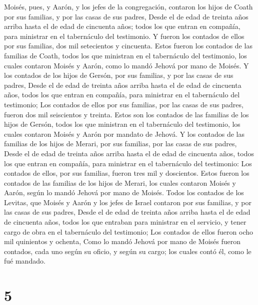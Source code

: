  Moisés, pues, y Aarón, y los jefes de la congregación,
contaron los hijos de Coath por sus familias, y por las casas de sus
padres,  Desde el de edad de treinta años arriba hasta el
de edad de cincuenta años; todos los que entran en compañía, para
ministrar en el tabernáculo del testimonio.  Y fueron los
contados de ellos por sus familias, dos mil setecientos y cincuenta.
 Estos fueron los contados de las familias de Coath,
todos los que ministran en el tabernáculo del testimonio, los cuales
contaron Moisés y Aarón, como lo mandó Jehová por mano de Moisés.
 Y los contados de los hijos de Gersón, por sus familias,
y por las casas de sus padres,  Desde el de edad de
treinta años arriba hasta el de edad de cincuenta años, todos los que
entran en compañía, para ministrar en el tabernáculo del testimonio;
 Los contados de ellos por sus familias, por las casas de
sus padres, fueron dos mil seiscientos y treinta.  Estos
son los contados de las familias de los hijos de Gersón, todos los que
ministran en el tabernáculo del testimonio, los cuales contaron Moisés y
Aarón por mandato de Jehová.  Y los contados de las
familias de los hijos de Merari, por sus familias, por las casas de sus
padres,  Desde el de edad de treinta años arriba hasta el
de edad de cincuenta años, todos los que entran en compañía, para
ministrar en el tabernáculo del testimonio:  Los contados
de ellos, por sus familias, fueron tres mil y doscientos.
 Estos fueron los contados de las familias de los hijos
de Merari, los cuales contaron Moisés y Aarón, según lo mandó Jehová por
mano de Moisés.  Todos los contados de los Levitas, que
Moisés y Aarón y los jefes de Israel contaron por sus familias, y por
las casas de sus padres,  Desde el de edad de treinta
años arriba hasta el de edad de cincuenta años, todos los que entraban
para ministrar en el servicio, y tener cargo de obra en el tabernáculo
del testimonio;  Los contados de ellos fueron ocho mil
quinientos y ochenta,  Como lo mandó Jehová por mano de
Moisés fueron contados, cada uno según su oficio, y según su cargo; los
cuales contó él, como le fué mandado.

\hypertarget{section-4}{%
\section{5}\label{section-4}}

